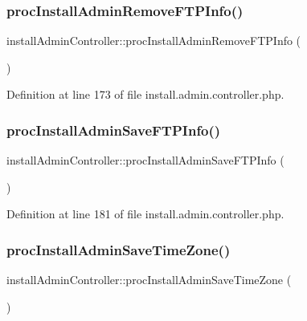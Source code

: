 \subsubsection{\texorpdfstring{proc\+Install\+Admin\+Remove\+F\+T\+P\+Info()}{procInstallAdminRemoveFTPInfo()}}
{\footnotesize\ttfamily install\+Admin\+Controller\+::proc\+Install\+Admin\+Remove\+F\+T\+P\+Info (\begin{DoxyParamCaption}{ }\end{DoxyParamCaption})}



Definition at line 173 of file install.\+admin.\+controller.\+php.

\mbox{\label{classinstallAdminController_a3ea9e37eed169cfa5448359db173f263}} 
\subsubsection{\texorpdfstring{proc\+Install\+Admin\+Save\+F\+T\+P\+Info()}{procInstallAdminSaveFTPInfo()}}
{\footnotesize\ttfamily install\+Admin\+Controller\+::proc\+Install\+Admin\+Save\+F\+T\+P\+Info (\begin{DoxyParamCaption}{ }\end{DoxyParamCaption})}



Definition at line 181 of file install.\+admin.\+controller.\+php.

\mbox{\label{classinstallAdminController_a0b7b97dd361bda6202fb1c8895852960}} 
\subsubsection{\texorpdfstring{proc\+Install\+Admin\+Save\+Time\+Zone()}{procInstallAdminSaveTimeZone()}}
{\footnotesize\ttfamily install\+Admin\+Controller\+::proc\+Install\+Admin\+Save\+Time\+Zone (\begin{DoxyParamCaption}{ }\end{DoxyParamCaption})}



